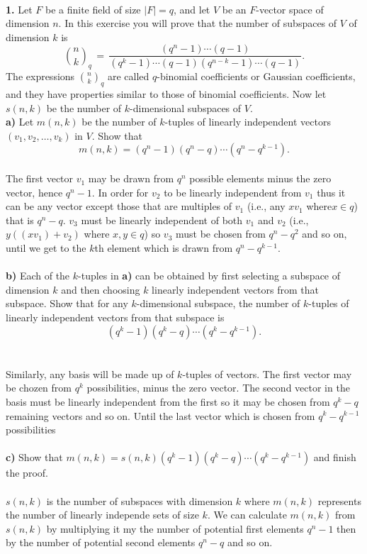 \documentclass[11pt]{amsart}
\theoremstyle{definition}  %
\begin{document}
\vfill
\eject
{}\\
{\bf 1.} Let $F$ be a finite field of size $|F| = q$, and let $V$ be an $F$-vector space of dimension $n$. In this exercise you will prove
that the number of subspaces of $V$ of dimension $k$ is 
$$ {n \choose k}_q \, = \, \frac{(q^n-1) \cdots (q-1)}{(q^k -1) \cdots (q-1)(q^{n-k} -1) \cdots (q-1)}.$$
The expressions ${n \choose k}_q$ are called $q$-binomial coefficients or Gaussian coefficients, and they have properties similar to those
of binomial coefficients. Now let $s(n,k)$ be the number of $k$-dimensional subspaces of $V$.\\
{\bf a)} Let $m(n,k)$ be the number of $k$-tuples of linearly independent vectors $(v_1, v_2, \ldots, v_k)$ in $V$.  Show that
$$ m(n,k) = (q^n-1)(q^n -q) \cdots (q^n - q^{k-1}).$$\\
The first vector $v_1$ may be drawn from $q^n$ possible elements minus the zero vector, hence $q^n-1$.  In order for $v_2$ to be linearly independent from $v_1$ thus it can be any vector except those that are multiples of $v_1$ (i.e., any $xv_1$ where$x \in q$) that is $q^n-q$.  $v_3$ must be linearly independent of both $v_1$ and $v_2$ (i.e., $y((xv_1) + v_2)$ where $x,y \in q$) so $v_3$ must be chosen from $q^n-q^2$ and so on, until we get to the $k$th element which is drawn from $q^n-q^{k-1}$.\\
\\
{\bf b)} Each of the $k$-tuples in {\bf a)} can be obtained by first selecting a subspace of dimension $k$ and then choosing $k$ linearly independent vectors from that subspace. Show that for any $k$-dimensional subspace, the number of $k$-tuples 
of linearly independent vectors from that subspace is 
$$(q^k-1)(q^k -q) \cdots (q^k - q^{k-1}).$$\\
\\
Similarly, any basis will be made up of $k$-tuples of vectors.  The first vector may be chozen from $q^k$ possibilities, minus the zero vector.  The second vector in the basis must be linearly independent from the first so it may be chosen from $q^k-q$ remaining vectors and so on.  Until the last vector which is chosen from $q^k-q^{k-1}$ possibilities\\
\\
{\bf c)} Show that $m(n,k) = s(n,k) (q^k-1)(q^k -q) \cdots (q^k - q^{k-1})$ and finish the proof. \\
\\
$s(n,k)$ is the number of subspaces with dimension $k$ where $m(n,k)$ represents the number of linearly independe sets of size $k$.  We can calculate $m(n,k)$ from $s(n,k)$ by multiplying it my the number of potential first elements $q^n-1$ then by the number of potential second elements $q^n-q$ and so on.\\
\\
\end{document}
